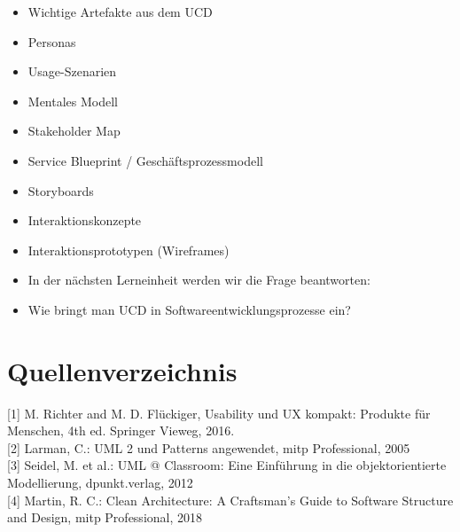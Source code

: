 \documentclass[10pt]{article}
\begin{document}
\begin{itemize}
  \item Wichtige Artefakte aus dem UCD
  \item Personas
  \item Usage-Szenarien
  \item Mentales Modell
  \item Stakeholder Map
  \item Service Blueprint / Geschäftsprozessmodell
  \item Storyboards
  \item Interaktionskonzepte
  \item Interaktionsprototypen (Wireframes)
  \item In der nächsten Lerneinheit werden wir die Frage beantworten:
  \item Wie bringt man UCD in Softwareentwicklungsprozesse ein?
\end{itemize}

\section*{Quellenverzeichnis}
[1] M. Richter and M. D. Flückiger, Usability und UX kompakt: Produkte für Menschen, 4th ed. Springer Vieweg, 2016.\\[0pt]
[2] Larman, C.: UML 2 und Patterns angewendet, mitp Professional, 2005\\[0pt]
[3] Seidel, M. et al.: UML @ Classroom: Eine Einführung in die objektorientierte Modellierung, dpunkt.verlag, 2012\\[0pt]
[4] Martin, R. C.: Clean Architecture: A Craftsman's Guide to Software Structure and Design, mitp Professional, 2018
\end{document}
